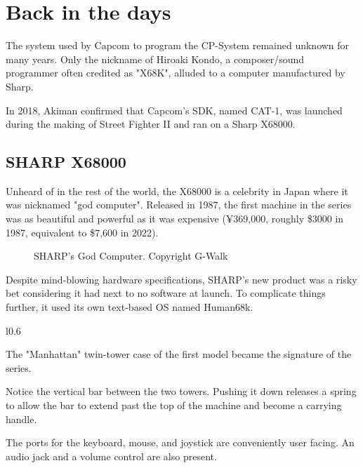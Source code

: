 \pagebreak

\section{Back in the days}
The system used by Capcom to program the CP-System remained unknown for many years. Only the nickname of Hiroaki Kondo, a composer/sound programmer often credited as "X68K", alluded to a computer manufactured by Sharp. 

In 2018,  Akiman confirmed\cite{x68000usage1}\cite{x68000usage2} that Capcom's SDK, named CAT-1, was launched during the making of Street Fighter II and ran on a Sharp X68000.

\subsection{SHARP X68000}

Unheard of in the rest of the world, the X68000 is a celebrity in Japan where it was nicknamed "god computer". 
Released in 1987, the first machine in the series was as beautiful and powerful as it was expensive (¥369,000, roughly \$3000 in 1987, equivalent to \$7,600 in 2022).

\vfill

 \begin{figure}[H]
\caption*{SHARP's God Computer. Copyright G-Walk\cite{x68k_perfect_catalogue}}
\end{figure}


Despite mind-blowing hardware specifications, SHARP's new product was a risky bet considering it had next to no software at launch. To complicate things further, it used its own text-based OS named Human68k.


\begin{wrapfigure}[35]{l}{0.6\textwidth}
\centering
{}
\end{wrapfigure}

The "Manhattan" twin-tower case of the first model became the signature of the series. 

Notice the vertical bar between the two towers. Pushing it down releases a spring to allow the bar to extend past the top of the machine and become a carrying handle.


The ports for the keyboard, mouse, and joystick are conveniently user facing. An audio jack and a volume control are also present.

